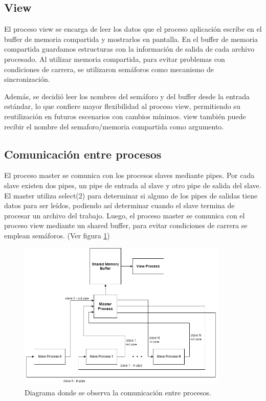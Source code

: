 \documentclass{article}
\begin{document}
\subsection{View}

El proceso view se encarga de leer los datos que el proceso aplicación escribe en el buffer de memoria compartida y mostrarlos en pantalla. En el buffer de memoria compartida guardamos estructuras con la información de salida de cada archivo procesado. Al utilizar memoria compartida, para evitar problemas con condiciones de carrera, se utilizaron semáforos como mecanismo de sincronización. 

Además, se decidió leer los nombres del semáforo y del buffer desde la entrada estándar, lo que confiere mayor flexibilidad al proceso view, permitiendo su reutilización en futuros escenarios con cambios mínimos. view también puede recibir el nombre del semaforo/memoria compartida como argumento.

\subsection{Comunicación entre procesos}

El proceso master se comunica con los procesos slaves mediante pipes. Por cada slave existen dos pipes, un pipe de entrada al slave y otro pipe de salida del slave. El master utiliza select(2) para determinar si alguno de los pipes de salidas tiene datos para ser leídos, podiendo así determinar cuando el slave termina de procesar un archivo del trabajo. Luego, el proceso master se comunica con el proceso view mediante un shared buffer, para evitar condiciones de carrera se emplean semáforos. (Ver figura \ref{fig:diagramaComunicacion})

\begin{figure}[H]
\begin{center}
\includegraphics[width=100mm]{diagramaComunicacion}
\caption{Diagrama donde se observa la comunicación entre procesos.}
\label{fig:diagramaComunicacion}
\end{center}
\end{figure}
\end{document}
